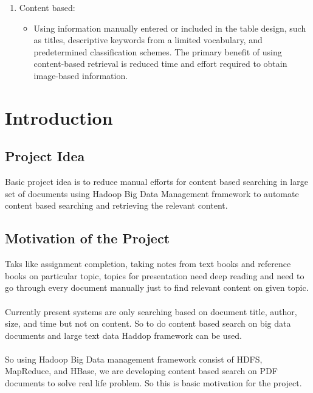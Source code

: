 \documentclass[oneside,a4paper,12pt]{report}
\begin{document}
\begin{enumerate}
\item Content based:
\begin{itemize}
\item Using information manually entered or included in the table design, such as titles, descriptive keywords from a limited vocabulary, and predetermined classification schemes. The primary benefit of using content-based retrieval is reduced time and effort required to obtain image-based information.
\end{itemize}

\end{enumerate}
			
\chapter{Introduction}
\section{Project Idea}
Basic project idea is to reduce manual efforts for content based searching in large set of documents using Hadoop Big Data Management framework to automate content based searching and retrieving the relevant content. 


\section{Motivation of the Project}  
Taks like assignment completion, taking notes from text books and reference books on particular topic, topics for presentation need deep reading and need to go through every document manually just to find relevant content on given topic. \\ \\
Currently present systems are only searching based on document title, author, size, and time but not on content. So to do content based search on big data documents and large text data Haddop framework can be used. \\ \\
So using Hadoop Big Data management framework consist of HDFS, MapReduce, and HBase, we are developing content based search on PDF documents to solve real life problem. So this is basic motivation for the project. \\

\newpage
\end{document}
